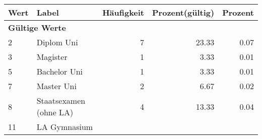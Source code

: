      \begin{longtable}{lXrrr}
     \toprule
     \textbf{Wert} & \textbf{Label} & \textbf{Häufigkeit} & \textbf{Prozent(gültig)} & \textbf{Prozent} \\
     \endhead
     \midrule
     \multicolumn{5}{l}{\textbf{Gültige Werte}}\\

     2 &
     \multicolumn{1}{X}{ Diplom Uni   } &


       \num{7} &
       \num[round-mode=places,round-precision=2]{23.33} &
         \num[round-mode=places,round-precision=2]{0.07} \\

     3 &
     \multicolumn{1}{X}{ Magister   } &


       \num{1} &
       \num[round-mode=places,round-precision=2]{3.33} &
         \num[round-mode=places,round-precision=2]{0.01} \\

     5 &
     \multicolumn{1}{X}{ Bachelor Uni   } &


       \num{1} &
       \num[round-mode=places,round-precision=2]{3.33} &
         \num[round-mode=places,round-precision=2]{0.01} \\

     7 &
     \multicolumn{1}{X}{ Master Uni   } &


       \num{2} &
       \num[round-mode=places,round-precision=2]{6.67} &
         \num[round-mode=places,round-precision=2]{0.02} \\

     8 &
     \multicolumn{1}{X}{ Staatsexamen (ohne LA)   } &


       \num{4} &
       \num[round-mode=places,round-precision=2]{13.33} &
         \num[round-mode=places,round-precision=2]{0.04} \\

     11 &
     \multicolumn{1}{X}{ LA Gymnasium   } &



\end{longtable}
